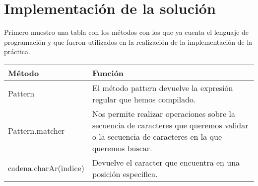 \documentclass[12pt]{article}
\begin{document}

	\section{Implementación de la solución}

	Primero muestro una tabla con los métodos con los que ya cuenta el 
	lenguaje de programación y que fueron utilizados en la realización 
	de la implementación de la práctica.

	 \begin{table}[H]
        \begin{tabular}{|p{6.5cm}|p{9.5cm}|}
        \hline
            \textbf{Método} & \textbf{Función} \\ \hline
            Pattern			& El método pattern devuelve la expresión regular que hemos compilado. \\ \hline
            Pattern.matcher & Nos permite realizar operaciones sobre la secuencia de caracteres que queremos validar o la secuencia de caracteres en la que queremos buscar. \\ \hline
            cadena.charAr(indice) & Devuelve el caracter que encuentra en una posición especifica. \\ \hline
        \end{tabular}
    \end{table}
\end{document}
